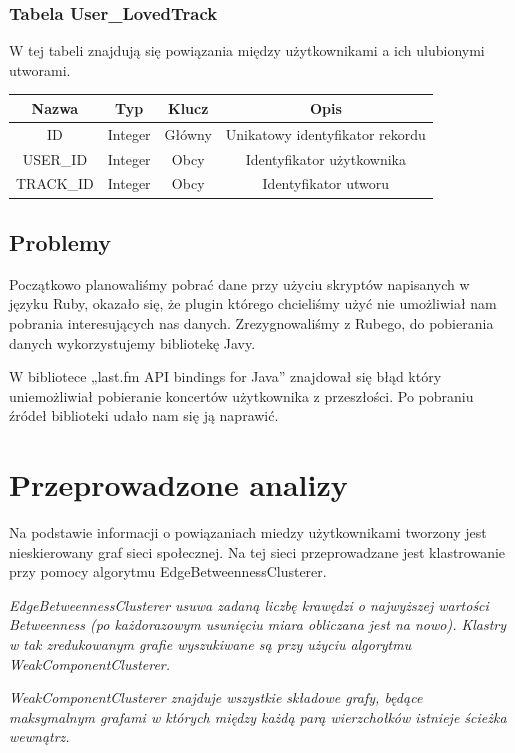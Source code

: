 \documentclass[10pt,a4paper]{article}
\begin{document}
\subsubsection{Tabela User\_LovedTrack}
W tej tabeli znajdują się powiązania między użytkownikami a ich ulubionymi utworami.

\begin{table}[H]
  \centering
    \begin{tabular}{cccc}
    \addlinespace
    \toprule
    Nazwa & Typ   & Klucz & Opis \\
    \midrule
    ID    & Integer & Główny & Unikatowy identyfikator rekordu \\
    USER\_ID & Integer & Obcy  & Identyfikator użytkownika \\
    TRACK\_ID & Integer & Obcy  & Identyfikator utworu \\
    \bottomrule
    \end{tabular}
  \label{tab:addlabel}
\end{table}

\subsection{Problemy}
Początkowo planowaliśmy pobrać dane przy użyciu skryptów napisanych w języku Ruby, okazało się, że plugin którego chcieliśmy użyć nie umożliwiał nam pobrania interesujących nas danych. Zrezygnowaliśmy z Rubego, do pobierania danych wykorzystujemy bibliotekę Javy.

W bibliotece „last.fm API bindings for Java” znajdował się błąd który uniemożliwiał pobieranie koncertów użytkownika z przeszłości. Po pobraniu źródeł biblioteki udało nam się ją naprawić.

\section{Przeprowadzone analizy}
Na podstawie informacji o powiązaniach miedzy użytkownikami tworzony jest nieskierowany graf sieci społecznej. Na tej sieci przeprowadzane jest klastrowanie przy pomocy algorytmu EdgeBetweennessClusterer.

{\itshape EdgeBetweennessClusterer usuwa zadaną liczbę krawędzi o najwyższej wartości Betweenness (po każdorazowym usunięciu miara obliczana jest na nowo). Klastry w tak zredukowanym grafie wyszukiwane są przy użyciu algorytmu WeakComponentClusterer.}

{\itshape WeakComponentClusterer znajduje wszystkie składowe grafy, będące maksymalnym grafami w których między każdą parą wierzchołków istnieje ścieżka wewnątrz.}
\end{document}

